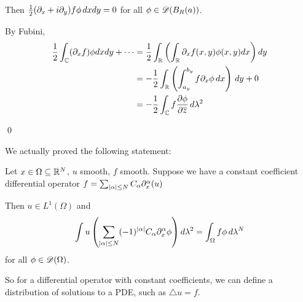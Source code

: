 \documentclass[x11names,reqno,14pt]{extarticle}
\begin{document}
Then $\frac{1}{2}(\partial_x + i\partial_y)f\phi\,dxdy = 0$ for all $\phi \in \mathscr{D}(B_R(a))$. 

\proof

By Fubini, 
\begin{align*}
\frac{1}{2}\int_{\mathbb{C}}(\partial_x f)\phi dxdy + \cdots & = \frac{1}{2}\int_{\mathbb{R}}\left(\int_{\mathbb{R}}\partial_xf(x, y)\phi(x, y)dx\right)dy \\
			& = -\frac{1}{2}\int_{\mathbb{R}}\left(\int_{a_y}^{b_y}f\partial_x\phi\,dx\right)\,dy + 0 \\
			& = -\frac{1}{2}\int_{\mathbb{C}}f\frac{\partial\phi}{\partial\overline{z}}\,d\lambda^2 \\
\end{align*}

\qed

We actually proved the following statement: 

Let $x \in \Omega\subseteq \mathbb{R}^N$, $u$ smooth, $f$ smooth.
Suppose we have a constant coefficient differential operator $f = \sum_{|\alpha|\leq N}C_\alpha\partial_x^{\alpha}(u)$

Then $u \in L^1(\Omega)$ and 
\[
\int u \left(\sum_{|\alpha|\leq N}(-1)^{|\alpha|}C_\alpha \partial_x^\alpha \phi\right)d\lambda^2 = \int_{\Omega}f\phi\,d\lambda^N
\]
for all $\phi \in \mathscr{D}(\Omega)$. 

So for a differential operator with constant coefficients, we can define a distribution of solutions to a PDE, such as $\bigtriangleup u = f$. 
\end{document}
